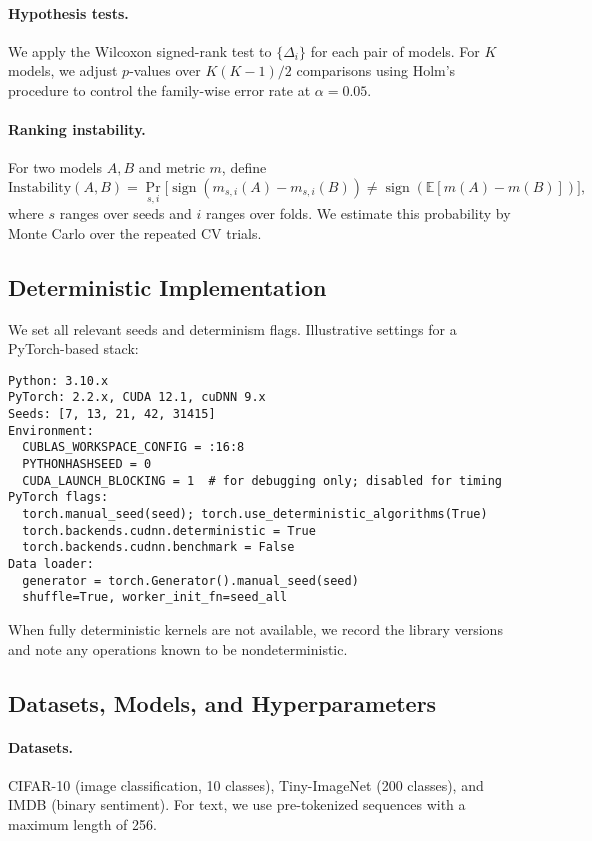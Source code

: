 \documentclass[11pt]{article}
\begin{document}
\paragraph{Hypothesis tests.} We apply the Wilcoxon signed-rank test to $\{\Delta_i\}$ for each pair of models. For $K$ models, we adjust $p$-values over $K(K-1)/2$ comparisons using Holm's procedure to control the family-wise error rate at $\alpha=0.05$.

\paragraph{Ranking instability.} For two models $A,B$ and metric $m$, define
\[\mathrm{Instability}(A,B) = \Pr_{s, i} \big[ \operatorname{sign}(m_{s,i}(A) - m_{s,i}(B)) \neq \operatorname{sign}(\mathbb{E}[m(A)-m(B)]) \big],\]
where $s$ ranges over seeds and $i$ ranges over folds. We estimate this probability by Monte Carlo over the repeated CV trials.

\subsection{Deterministic Implementation}
We set all relevant seeds and determinism flags. Illustrative settings for a PyTorch-based stack:
\begin{verbatim}
Python: 3.10.x
PyTorch: 2.2.x, CUDA 12.1, cuDNN 9.x
Seeds: [7, 13, 21, 42, 31415]
Environment:
  CUBLAS_WORKSPACE_CONFIG = :16:8
  PYTHONHASHSEED = 0
  CUDA_LAUNCH_BLOCKING = 1  # for debugging only; disabled for timing
PyTorch flags:
  torch.manual_seed(seed); torch.use_deterministic_algorithms(True)
  torch.backends.cudnn.deterministic = True
  torch.backends.cudnn.benchmark = False
Data loader:
  generator = torch.Generator().manual_seed(seed)
  shuffle=True, worker_init_fn=seed_all
\end{verbatim}
When fully deterministic kernels are not available, we record the library versions and note any operations known to be nondeterministic.

\subsection{Datasets, Models, and Hyperparameters}
\paragraph{Datasets.} CIFAR-10 (image classification, 10 classes), Tiny-ImageNet (200 classes), and IMDB (binary sentiment). For text, we use pre-tokenized sequences with a maximum length of 256.
\end{document}
